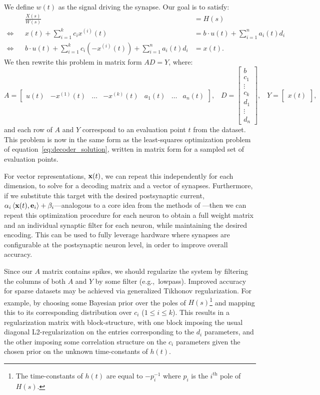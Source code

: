 We define ${w}(t)$ as the signal driving the synapse. Our goal is to satisfy:
\begin{align*}
    && \frac{{X}(s)}{{W}(s)} &= H(s) \\
    \iff && {x}(t) + \sum_{i=1}^k c_i {x}^{(i)}(t) &= {b} \cdot {u}(t) + \sum_{i=1}^n a_i(t) {d}_i \\
    \iff && {b} \cdot {u}(t) + \sum_{i=1}^k c_i \left(-{x}^{(i)}(t)\right) + \sum_{i=1}^n a_i(t) {d}_i &= {x}(t) \text{.}
\end{align*}
We then rewrite this problem in matrix form $AD = Y$, where:
$$A = \left[ \begin{matrix} {u}(t) & -{x}^{(1)}(t) & \ldots & -{x}^{(k)}(t) & a_1(t) & \ldots & a_n(t)  \end{matrix} \right] \text{,} \quad D = \left[ \begin{matrix} {b} \\ c_1 \\ \vdots \\ c_k \\ d_1 \\ \vdots \\ d_n \end{matrix} \right] \text{,} \quad Y = \left[ \begin{matrix} {x}(t) \end{matrix} \right]\text{,}$$
and each row of $A$ and $Y$ correspond to an evaluation point $t$ from the dataset.
This problem is now in the same form as the least-squares optimization problem of equation~\ref{eq:decoder_solution}, written in matrix form for a sampled set of evaluation points.

For vector representations, $\mathbf{x}(t)$, we can repeat this independently for each dimension, to solve for a decoding matrix and a vector of synapses. 
Furthermore, if we substitute this target with the desired postsynaptic current, $\alpha_i \left \langle \mathbf{x}(t)\text{,}\, \mathbf{e}_i \right \rangle + \beta_i$---analogous to a core idea from the methods of \citet{tripp2006neural, stoeckel2018}---then we can repeat this optimization procedure for each neuron to obtain a full weight matrix and an individual synaptic filter for each neuron, while maintaining the desired encoding.
This can be used to fully leverage hardware where synapses are configurable at the postsynaptic neuron level, in order to improve overall accuracy.

Since our $A$ matrix contains spikes, we should regularize the system by filtering the columns of both $A$ and $Y$ by some filter (e.g.,~lowpass).
Improved accuracy for sparse datasets may be achieved via generalized Tikhonov regularization.
For example, by choosing some Bayesian prior over the poles of $H(s)$\footnote{%
The time-constants of $h(t)$ are equal to $-p_i^{-1}$ where $p_i$ is the $i^\text{th}$ pole of $H(s)$.} and mapping this to its corresponding distribution over $c_i$ ($1 \le i \le k$).
This results in a regularization matrix with block-structure, with one block imposing the usual diagonal L2-regularization on the entries corresponding to the $d_i$ parameters, and the other imposing some correlation structure on the $c_i$ parameters given the chosen prior on the unknown time-constants of $h(t)$.


